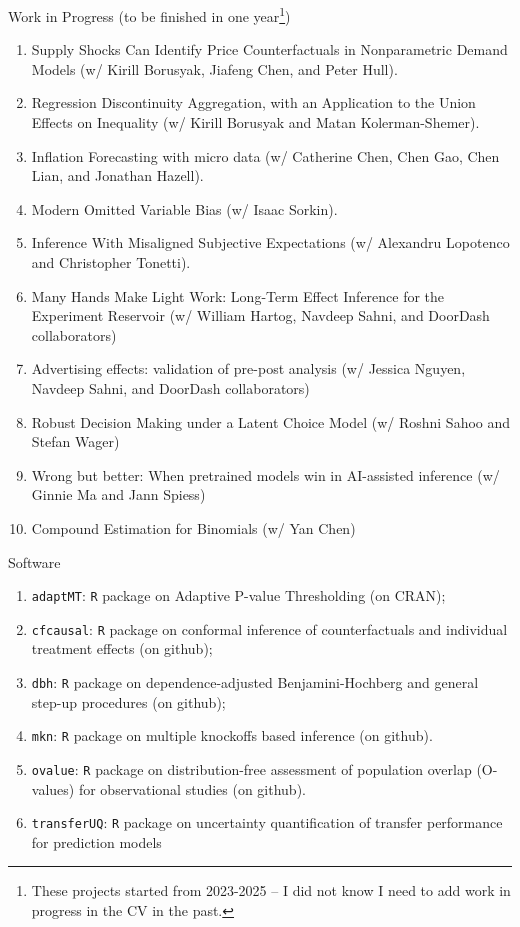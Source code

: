 \documentclass{article}
\begin{document}
{\color{red}
\begin{large}
\noindent Work in Progress (to be finished in one year\footnote{These projects started from 2023-2025 -- I did not know I need to add work in progress in the CV in the past.})
\end{large}

\begin{enumerate}
\item Supply Shocks Can Identify Price Counterfactuals in Nonparametric Demand Models (w/ Kirill Borusyak, Jiafeng Chen, and Peter Hull).
\item Regression Discontinuity Aggregation, with an Application to the Union Effects on Inequality (w/ Kirill
  Borusyak and Matan Kolerman-Shemer).
\item Inflation Forecasting with micro data (w/ Catherine Chen, Chen Gao, Chen Lian, and Jonathan Hazell).
\item Modern Omitted Variable Bias (w/ Isaac Sorkin).
\item Inference With Misaligned Subjective Expectations (w/ Alexandru Lopotenco and Christopher Tonetti).
\item Many Hands Make Light Work: Long-Term Effect Inference for the Experiment Reservoir (w/ William Hartog, Navdeep Sahni, and DoorDash collaborators)
\item Advertising effects: validation of pre-post analysis (w/ Jessica Nguyen, Navdeep Sahni, and DoorDash collaborators)
\item Robust Decision Making under a Latent Choice Model (w/ Roshni Sahoo and Stefan Wager)
\item Wrong but better: When pretrained models win in AI-assisted inference (w/ Ginnie Ma and Jann Spiess)
\item Compound Estimation for Binomials (w/ Yan Chen)  
\end{enumerate}
}

\begin{large}
\noindent Software
\end{large}

\begin{enumerate}
\item \texttt{adaptMT}: \texttt{R} package on Adaptive P-value Thresholding (on CRAN);
\item \texttt{cfcausal}: \texttt{R} package on conformal inference of counterfactuals and individual treatment effects (on github);
\item \texttt{dbh}: \texttt{R} package on dependence-adjusted Benjamini-Hochberg and general step-up procedures (on github);
\item \texttt{mkn}: \texttt{R} package on multiple knockoffs based inference (on github).
\item \texttt{ovalue}: \texttt{R} package on distribution-free assessment of population overlap (O-values) for observational studies (on github).
\item \texttt{transferUQ}: \texttt{R} package on uncertainty quantification of transfer performance for prediction models
\end{enumerate}
\end{document}
